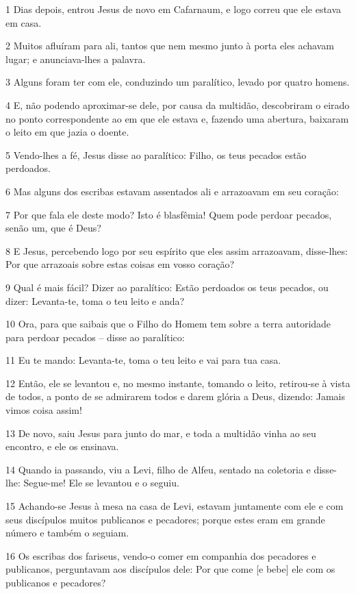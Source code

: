\par 1 Dias depois, entrou Jesus de novo em Cafarnaum, e logo correu que ele estava em casa.
\par 2 Muitos afluíram para ali, tantos que nem mesmo junto à porta eles achavam lugar; e anunciava-lhes a palavra.
\par 3 Alguns foram ter com ele, conduzindo um paralítico, levado por quatro homens.
\par 4 E, não podendo aproximar-se dele, por causa da multidão, descobriram o eirado no ponto correspondente ao em que ele estava e, fazendo uma abertura, baixaram o leito em que jazia o doente.
\par 5 Vendo-lhes a fé, Jesus disse ao paralítico: Filho, os teus pecados estão perdoados.
\par 6 Mas alguns dos escribas estavam assentados ali e arrazoavam em seu coração:
\par 7 Por que fala ele deste modo? Isto é blasfêmia! Quem pode perdoar pecados, senão um, que é Deus?
\par 8 E Jesus, percebendo logo por seu espírito que eles assim arrazoavam, disse-lhes: Por que arrazoais sobre estas coisas em vosso coração?
\par 9 Qual é mais fácil? Dizer ao paralítico: Estão perdoados os teus pecados, ou dizer: Levanta-te, toma o teu leito e anda?
\par 10 Ora, para que saibais que o Filho do Homem tem sobre a terra autoridade para perdoar pecados -- disse ao paralítico:
\par 11 Eu te mando: Levanta-te, toma o teu leito e vai para tua casa.
\par 12 Então, ele se levantou e, no mesmo instante, tomando o leito, retirou-se à vista de todos, a ponto de se admirarem todos e darem glória a Deus, dizendo: Jamais vimos coisa assim!
\par 13 De novo, saiu Jesus para junto do mar, e toda a multidão vinha ao seu encontro, e ele os ensinava.
\par 14 Quando ia passando, viu a Levi, filho de Alfeu, sentado na coletoria e disse-lhe: Segue-me! Ele se levantou e o seguiu.
\par 15 Achando-se Jesus à mesa na casa de Levi, estavam juntamente com ele e com seus discípulos muitos publicanos e pecadores; porque estes eram em grande número e também o seguiam.
\par 16 Os escribas dos fariseus, vendo-o comer em companhia dos pecadores e publicanos, perguntavam aos discípulos dele: Por que come [e bebe] ele com os publicanos e pecadores?
